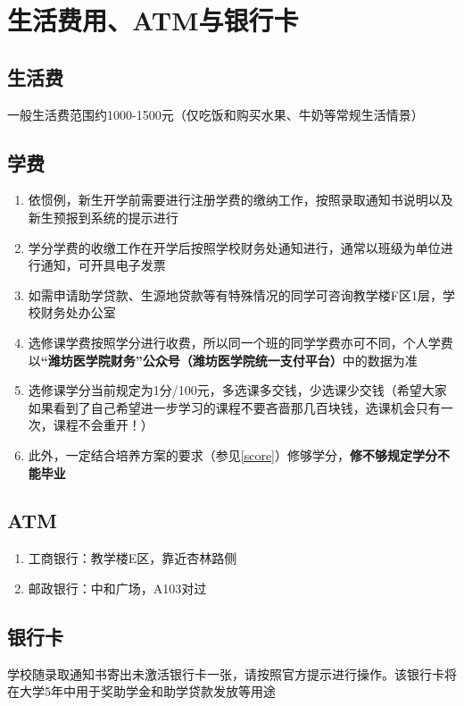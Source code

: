 \chapter[生活费用、ATM与银行卡]{生活费用、ATM与银行卡}
\section[生活费]{生活费}
一般生活费范围约1000-1500元（仅吃饭和购买水果、牛奶等常规生活情景）

\section[学费]{学费\footnotemark}
\begin{enumerate}
    \item 依惯例，新生开学前需要进行注册学费的缴纳工作，按照录取通知书说明以及新生预报到系统\footnotemark 的提示进行
    \item 学分学费的收缴工作在开学后按照学校财务处通知进行，通常以班级为单位进行通知，可开具电子发票
    \item 如需申请助学贷款、生源地贷款等有特殊情况的同学可咨询教学楼F区1层，学校财务处办公室
    \item 选修课学费按照学分进行收费，所以同一个班的同学学费亦可不同，个人学费以\textbf{“潍坊医学院财务”公众号（潍坊医学院统一支付平台）}中的数据为准
    \item 选修课学分当前规定为1分/100元，多选课多交钱，少选课少交钱（希望大家如果看到了自己希望进一步学习的课程不要吝啬那几百块钱，选课机会只有一次，课程不会重开！）
    \item 此外，一定结合培养方案的要求（参见\uline{\ref{score}}）修够学分，\textbf{修不够规定学分不能毕业}
\end{enumerate}

\section[ATM]{ATM\footnotemark}
\begin{enumerate}
    \item 工商银行：教学楼E区，靠近杏林路侧
    \item 邮政银行：中和广场，A103对过
\end{enumerate}

\section[银行卡]{银行卡}
学校随录取通知书寄出未激活银行卡一张，请按照官方提示进行操作。该银行卡将在大学5年中用于奖助学金和助学贷款发放等用途
